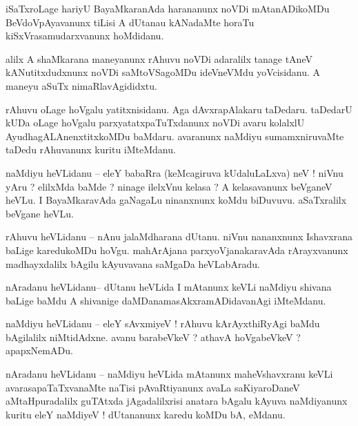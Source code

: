 \documentclass{article}
\begin{document}
\begin{mn}%
iSaTxroLage hariyU BayaMkaranAda harananunx noVDi mAtanADikoMDu BeVdoVpAyavanunx tiLisi A 
dUtanau kANadaMte horaTu kiSxVrasamudarxvanunx hoMdidanu.
\end{mn}

\begin{mn}%
alilx A shaMkarana maneyanunx rAhuvu noVDi adaralilx tanage tAneV kANutitxdudxnunx noVDi 
saMtoVSagoMDu ideVneVMdu yoVcisidanu. A maneyu aSuTx nimaRlavAgididxtu.
\end{mn}

\begin{mn}%
rAhuvu oLage hoVgalu yatitxnisidanu. Aga dAvxrapAlakaru taDedaru. taDedarU kUDa oLage 
hoVgalu parxyatatxpaTuTxdanunx noVDi avaru kolalxlU AyudhagALAnenxtitxkoMDu baMdaru. 
avaranunx naMdiyu sumamxniruvaMte taDedu rAhuvanunx kuritu iMteMdanu.
\end{mn}

\begin{mn}%
naMdiyu heVLidanu -- eleY babaRra (keMcagiruva kUdaluLaLxva) neV ! niVnu yAru ? elilxMda 
baMde ? ninage ilelxVnu kelasa ? A kelasavanunx beVganeV heVLu. I BayaMkaravAda gaNagaLu 
ninanxnunx koMdu biDuvuvu. aSaTxralilx beVgane heVLu.
\end{mn}

\begin{mn}%
rAhuvu heVLidanu -- nAnu jalaMdharana dUtanu. niVnu nananxnunx Ishavxrana baLige karedukoMDu 
hoVgu. mahArAjana parxyoVjanakaravAda rArayxvanunx madhayxdalilx bAgilu kAyuvavana saMgaDa 
heVLabAradu.
\end{mn}

\begin{mn}%
nAradanu heVLidanu-- dUtanu heVLida I mAtanunx keVLi naMdiyu shivana baLige baMdu A 
shivanige daMDanamasAkxramADidavanAgi iMteMdanu.
\end{mn}

\begin{mn}%
naMdiyu heVLidanu -- eleY sAvxmiyeV ! rAhuvu kArAyxthiRyAgi baMdu bAgilalilx niMtidAdxne. 
avanu barabeVkeV ? athavA hoVgabeVkeV ? apapxNemADu.
\end{mn}

\begin{mn}%
nAradanu heVLidanu -- naMdiyu heVLida mAtanunx maheVshavxranu keVLi avarasapaTaTxvanaMte 
naTisi pAvaRtiyanunx avaLa saKiyaroDaneV aMtaHpuradalilx guTAtxda jAgadalilxrisi anatara 
bAgalu kAyuva naMdiyanunx kuritu eleY naMdiyeV ! dUtananunx karedu koMDu bA, eMdanu.
\end{mn}
\end{document}
